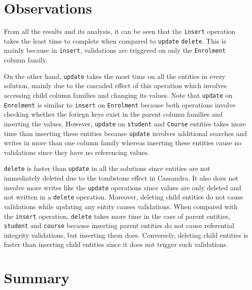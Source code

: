 



\section{Observations} 
From all the results and its analysis, it can be seen that the \texttt{insert}
operation takes the least time to complete when compared to \texttt{update}
\texttt{delete}. This is mainly because in \texttt{insert}, validations are
triggered on only the \texttt{Enrolment} column family. 

On the other hand, \texttt{update} takes the most time on all the entities in
every solution, mainly due to the cascaded effect of this operation which
involves accessing child column families and changing its values. Note that
\texttt{update} on \texttt{Enrolment} is similar to \texttt{insert} on
\texttt{Enrolment} because both operations involve checking whether the foriegn
keys exist in the parent column families and inserting the values. However,
\texttt{update} on \texttt{student} and  \texttt{Course} entities takes more
time than inserting these entities because \texttt{update} involves additional
searches and writes in more than one column family whereas inserting these
entities cause no validations since they have no referencing values.

\texttt{delete} is faster than \texttt{update} in all the solutions since
entities are not immediately deleted due to the tombstone effect in Cassandra.
It also does not involve more writes like the \texttt{update} operations since
values are only deleted and not written in a \texttt{delete} operation.
Moreover, deleting child entities do not cause validations while updating any
entity causes validations. When compared with the \texttt{insert} operation,
\texttt{delete} takes more time in the case of parent entities, \texttt{student}
and \texttt{course} because inserting parent entities do not cause referential
integrity validations, but inserting them does. Conversely, deleting child
entities is faster than inserting child entities since it does not trigger such
validations.

\section{Summary} \label{s:results-summary}


